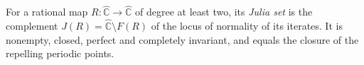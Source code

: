 
For a rational map $R:\widehat{\mathbb C}\to\widehat{\mathbb C}$ of degree at least two, its \emph{Julia set} is the complement $J(R)=\widehat{\mathbb C}\setminus F(R)$ of the locus of normality of its iterates. It is nonempty, closed, perfect and completely invariant, and equals the closure of the repelling periodic points.
